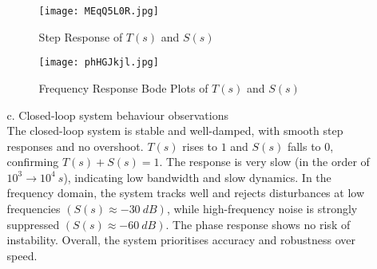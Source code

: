 \documentclass[12pt,a4paper]{article}
\begin{document}
\begin{enumerate}
\begin{enumerate}
\begin{figure}[H]
					\centering
					\texttt{[image: MEqQ5L0R.jpg]}
					\caption{Step Response of $T(s)$ and $S(s)$}
				\end{figure}
				\begin{figure}[H]
					\centering
					\texttt{[image: phHGJkjl.jpg]}
					\caption{Frequency Response Bode Plots of $T(s)$ and $S(s)$}
				\end{figure}
				\hfill
			\item [c.] Closed-loop system behaviour observations\\
The closed-loop system is stable and well-damped, with smooth step responses and no overshoot. $T(s)$  rises to $1$ and $S(s)$ falls to $0$, confirming $T(s)+S(s)=1$. The response is very slow (in the order of $10^3\rightarrow 10^4\:s$), indicating low bandwidth and slow dynamics. In the frequency domain, the system tracks well and rejects disturbances at low frequencies $(S(s)\approx -30\:dB)$, while high-frequency noise is strongly suppressed  $(S(s)\approx -60\:dB)$. The phase response shows no risk of instability. Overall, the system prioritises accuracy and robustness over speed.
				\hfill
		\end{enumerate}
\end{enumerate}

\newpage
\end{document}
